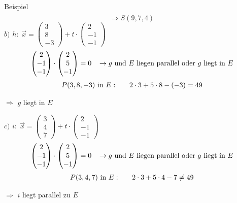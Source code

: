 \documentclass{article}
\begin{document}
\begin{boxx}[DarkBlue]{Beispiel}
\begin{align*}
    \end{align*}
    \[\Rightarrow S(9,7,4)\]
    $b)$\hspace{3mm} $h:\; \vec{x} = \begin{pmatrix}3\\8\\-3\end{pmatrix} + t\cdot \begin{pmatrix}2\\-1\\-1\end{pmatrix}$
    \begin{align*}
        \begin{pmatrix}2\\-1\\-1\end{pmatrix} \cdot \begin{pmatrix}2\\5\\-1\end{pmatrix} = 0 \hspace*{3mm} \rightarrow \text{$g$ und $E$ liegen parallel oder $g$ liegt in $E$}
    \end{align*}
    \begin{align*}
       P(3,8,-3) \text{ in }E: \hspace*{6mm} 2\cdot 3 + 5 \cdot 8 - (-3) = 49
    \end{align*}
    \begin{center}
        $\Rightarrow$ $g$ liegt in $E$
    \end{center}
    \newpage
    $c)$\hspace{3mm} $i:\; \vec{x} = \begin{pmatrix}3\\4\\7\end{pmatrix} + t\cdot \begin{pmatrix}2\\-1\\-1\end{pmatrix}$
    \begin{align*}
        \begin{pmatrix}2\\-1\\-1\end{pmatrix} \cdot \begin{pmatrix}2\\5\\-1\end{pmatrix} = 0 \hspace*{3mm} \rightarrow \text{$g$ und $E$ liegen parallel oder $g$ liegt in $E$}
    \end{align*}
    \begin{align*}
       P(3,4,7) \text{ in }E: \hspace*{6mm} 2\cdot 3 + 5 \cdot 4 - 7 \not= 49
    \end{align*}
    \begin{center}
        $\Rightarrow$ $i$ liegt parallel zu $E$
    \end{center}
\end{boxx}
\end{document}
